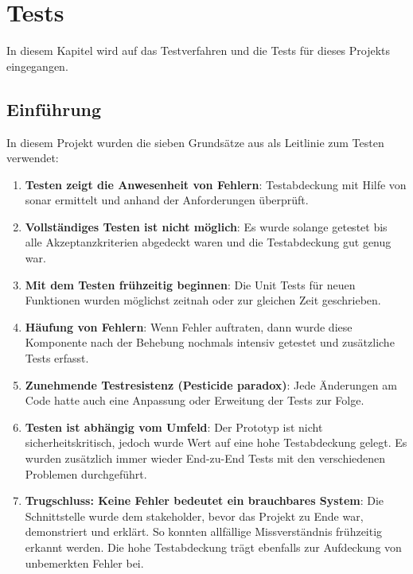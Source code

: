 %
%

\chapter{Tests \resultAssignment{[R6]}}\label{chap.tests} 
In diesem Kapitel wird auf das Testverfahren und die Tests für dieses Projekts eingegangen.

\section{Einführung}
In diesem Projekt wurden die sieben Grundsätze aus \cite{test_soft_book} als Leitlinie zum Testen verwendet:
\begin{enumerate}
\item \textbf{Testen zeigt die Anwesenheit von Fehlern}: Testabdeckung mit Hilfe von \gls{sonar} ermittelt und anhand der Anforderungen überprüft.
\item \textbf{Vollständiges Testen ist nicht möglich}: Es wurde solange getestet bis alle Akzeptanzkriterien abgedeckt waren und die Testabdeckung gut genug war.
\item \textbf{Mit dem Testen frühzeitig beginnen}: Die Unit Tests für neuen Funktionen wurden möglichst zeitnah oder zur gleichen Zeit geschrieben.
\item \textbf{Häufung von Fehlern}: Wenn Fehler auftraten, dann wurde diese Komponente nach der Behebung nochmals intensiv getestet und zusätzliche Tests erfasst.
\item \textbf{Zunehmende Testresistenz (Pesticide paradox)}: Jede Änderungen am Code hatte auch eine Anpassung oder Erweitung der Tests zur Folge.
\item \textbf{Testen ist abhängig vom Umfeld}: Der Prototyp ist nicht sicherheitskritisch, jedoch wurde Wert auf eine hohe Testabdeckung gelegt. Es wurden zusätzlich immer wieder 
	End-zu-End Tests mit den verschiedenen Problemen durchgeführt.
\item \textbf{Trugschluss: Keine Fehler bedeutet ein brauchbares System}: Die Schnittstelle wurde dem \gls{stakeholder}, bevor das Projekt zu Ende war, demonstriert und erklärt. So 
	konnten allfällige Missverständnis frühzeitig erkannt werden. Die hohe Testabdeckung trägt ebenfalls zur Aufdeckung von unbemerkten Fehler bei.
\end{enumerate}

